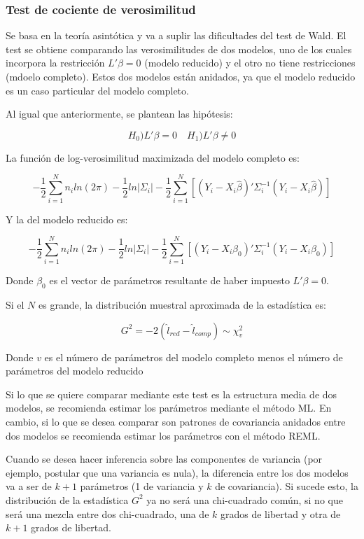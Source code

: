 \documentclass[spanish]{article}
\numberwithin{figure}{subsection}
\numberwithin{equation}{subsection}
\numberwithin{table}{subsection}
\begin{document}
\subsubsection{Test de cociente de verosimilitud}

Se basa en la teoría asintótica y va a suplir las dificultades del test de Wald. El test se obtiene comparando las
verosimilitudes de dos modelos, uno de los cuales incorpora la restricción $L'\beta = 0$ (modelo reducido) y el otro no
tiene restricciones (mdoelo completo). Estos dos modelos están anidados, ya que el modelo reducido es un caso particular
del modelo completo.

Al igual que anteriormente, se plantean las hipótesis:

\[ H_0) L'\beta = 0 \quad H_1) L'\beta \neq 0 \]

La función de log-verosimilitud maximizada del modelo completo es:

\[ -\frac{1}{2} \sum_{i=1}^{N}n_i ln(2\pi) - \frac{1}{2}ln|\varSigma_i| -
\frac{1}{2} \sum_{i=1}^{N} [(Y_i - X_i\hat{\beta})' \varSigma_i^{-1} (Y_i - X_i\hat{\beta})] \]

Y la del modelo reducido es:

\[ -\frac{1}{2} \sum_{i=1}^{N}n_i ln(2\pi) - \frac{1}{2}ln|\varSigma_i| -
\frac{1}{2} \sum_{i=1}^{N} [(Y_i - X_i\beta_0)' \varSigma_i^{-1} (Y_i - X_i\beta_0)] \]

Donde $\beta_0$ es el vector de parámetros resultante de haber impuesto $L'\beta = 0$.

Si el $N$ es grande, la distribución muestral aproximada de la estadística es:

\[ G^2 = -2 (\hat{l}_{red} - \hat{l}_{comp}) \sim \chi_v^2 \]

Donde $v$ es el número de parámetros del modelo completo menos el número de parámetros del modelo reducido

Si lo que se quiere comparar mediante este test es la estructura media de dos modelos, se recomienda estimar los parámetros
mediante el método ML. En cambio, si lo que se desea comparar son patrones de covariancia anidados entre dos modelos se
recomienda estimar los parámetros con el método REML.

Cuando se desea hacer inferencia sobre las componentes de variancia (por ejemplo, postular que una variancia es nula),
la diferencia entre los dos modelos va a ser de $k+1$ parámetros (1 de variancia y $k$ de covariancia). Si sucede esto,
la distribución de la estadística $G^2$ ya no será una chi-cuadrado común, si no que será una mezcla entre dos chi-cuadrado,
una de $k$ grados de libertad y otra de $k+1$ grados de libertad.
\end{document}
